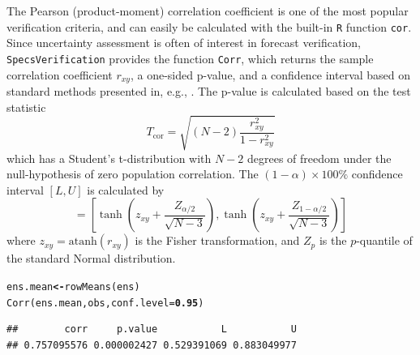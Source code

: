 \documentclass[10pt]{article}\usepackage[]{graphicx}\usepackage[]{color}
\makeatletter
\newcommand{\hlnum}[1]{\textcolor[rgb]{0.502,0,0.502}{\textbf{#1}}}%
\newcommand{\hlstd}[1]{\textcolor[rgb]{0,0,0}{#1}}%
\newcommand{\hlkwb}[1]{\textcolor[rgb]{0.502,0.502,0.753}{\textbf{#1}}}%
\newcommand{\hlkwc}[1]{\textcolor[rgb]{0,0.502,0.753}{#1}}%
\newcommand{\hlkwd}[1]{\textcolor[rgb]{0,0.267,0.4}{#1}}%
\newenvironment{kframe}{%
 \def\at@end@of@kframe{}%
 \ifinner\ifhmode%
  \def\at@end@of@kframe{\end{minipage}}%
  \begin{minipage}{\columnwidth}%
 \fi\fi%
 \def\FrameCommand##1{\hskip\@totalleftmargin \hskip-\fboxsep
 \colorbox{shadecolor}{##1}\hskip-\fboxsep
     \hskip-\linewidth \hskip-\@totalleftmargin \hskip\columnwidth}%
 \MakeFramed {\advance\hsize-\width
   \@totalleftmargin\z@ \linewidth\hsize
   \@setminipage}}%
 {\par\unskip\endMakeFramed%
 \at@end@of@kframe}
\newenvironment{knitrout}{}{} %
\newcommand{\atanh}{\text{atanh}}
\newcommand{\proglang}[1]{\texttt{#1}}
\newcommand{\pkg}[1]{\texttt{#1}}
\newcommand{\code}[1]{\texttt{#1}}
\makeatother
\begin{document}
The Pearson (product-moment) correlation coefficient is one of the most popular verification criteria, and can easily be calculated with the built-in \proglang{R} function \code{cor}.
Since uncertainty assessment is often of interest in forecast verification, \pkg{SpecsVerification} provides the function \code{Corr}, which returns the sample correlation coefficient $r_{xy}$, a one-sided p-value, and a confidence interval based on standard methods presented in, e.g., \citet{vonstorch2001statistical}.
The p-value is calculated based on the test statistic
%
\begin{equation}
T_{\text{cor}} = \sqrt{(N-2) \frac{r_{xy}^2}{1 - r_{xy}^2}}
\end{equation}
%
which has a Student's t-distribution with $N-2$ degrees of freedom under the null-hypothesis of zero population correlation.
The $(1-\alpha)\times 100\%$ confidence interval $[L,U]$ is calculated by
%
\begin{equation}
[L, U] = \left[ \tanh\left(z_{xy} + \frac{Z_{\alpha/2}}{\sqrt{N-3}}\right), \tanh\left(z_{xy} + \frac{Z_{1-\alpha/2}}{\sqrt{N-3}}\right)\right]\label{eq:fisherCi}
\end{equation} 
%
where $z_{xy} = \atanh(r_{xy})$ is the Fisher transformation, and $Z_p$ is the $p$-quantile of the standard Normal distribution.
%
\begin{knitrout}
\color{fgcolor}\begin{kframe}
\begin{alltt}
\hlstd{ens.mean} \hlkwb{<-} \hlkwd{rowMeans}\hlstd{(ens)}
\hlkwd{Corr}\hlstd{(ens.mean, obs,} \hlkwc{conf.level}\hlstd{=}\hlnum{0.95}\hlstd{)}
\end{alltt}
\begin{verbatim}
##        corr     p.value           L           U 
## 0.757095576 0.000002427 0.529391069 0.883049977
\end{verbatim}
\end{kframe}
\end{knitrout}
\end{document}
